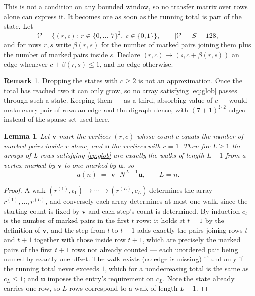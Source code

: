 \documentclass[11pt,a4paper]{article}
\theoremstyle{plain}
\newtheorem{lemma}[theorem]{Lemma}
\theoremstyle{definition}
\newtheorem{remark}[theorem]{Remark}
\begin{document}
This is not a condition on any bounded window, so no transfer matrix over rows alone can
express it. It becomes one as soon as the running total is part of the state. Let
\[
\mathcal V=\bigl\{(r,c):\ r\in\{0,\dots,7\}^{2},\ c\in\{0,1\}\bigr\},
\qquad |\mathcal V|=S=128,
\]
and for rows $r,s$ write $\beta(r,s)$ for the number of marked pairs joining them plus the
number of marked pairs inside $s$. Declare $(r,c)\to(s,c+\beta(r,s))$ an edge whenever
$c+\beta(r,s)\le1$, and no edge otherwise.

\begin{remark}
Dropping the states with $c\ge2$ is not an approximation. Once the total has reached two it
can only grow, so no array satisfying \eqref{eq:glob} passes through such a state. Keeping
them --- as a third, absorbing value of $c$ --- would make every pair of rows an edge and
the digraph dense, with $(7+1)^{2\cdot2}$ edges instead of the sparse set used here.
\end{remark}

\begin{lemma}\label{lem:walk}
Let $\mathbf{v}$ mark the vertices $(r,c)$ whose count $c$ equals the number of marked pairs
inside $r$ alone, and $\mathbf{u}$ the vertices with $c=1$. Then for $L\ge1$ the arrays
of $L$ rows satisfying \eqref{eq:glob} are exactly the walks of length $L-1$ from a
vertex marked by $\mathbf{v}$ to one marked by $\mathbf{u}$, so
\[
a(n)\;=\;\,\mathbf{v}^{\!\top}N^{\,L-1}\mathbf{u},\qquad L=n .
\]
\end{lemma}

\begin{proof}
A walk $(r^{(1)},c_1)\to\cdots\to(r^{(L)},c_L)$ determines the array
$r^{(1)},\dots,r^{(L)}$, and conversely each array determines at most one walk, since the
starting count is fixed by $\mathbf{v}$ and each step's count is determined. By induction
$c_t$ is the number of marked pairs in the first $t$ rows: it holds at $t=1$ by the
definition of $\mathbf{v}$, and the step from $t$ to $t+1$ adds exactly the pairs joining
rows $t$ and $t+1$ together with those inside row $t+1$, which are precisely the marked
pairs of the first $t+1$ rows not already counted --- each unordered pair being named by
exactly one offset. The walk exists (no edge is missing) if and only if the running total
never exceeds $1$, which for a nondecreasing total is the same as $c_L\le1$; and
$\mathbf{u}$ imposes the entry's requirement on $c_L$. Note the state already carries one
row, so $L$ rows correspond to a walk of length $L-1$.
\end{proof}
\end{document}
